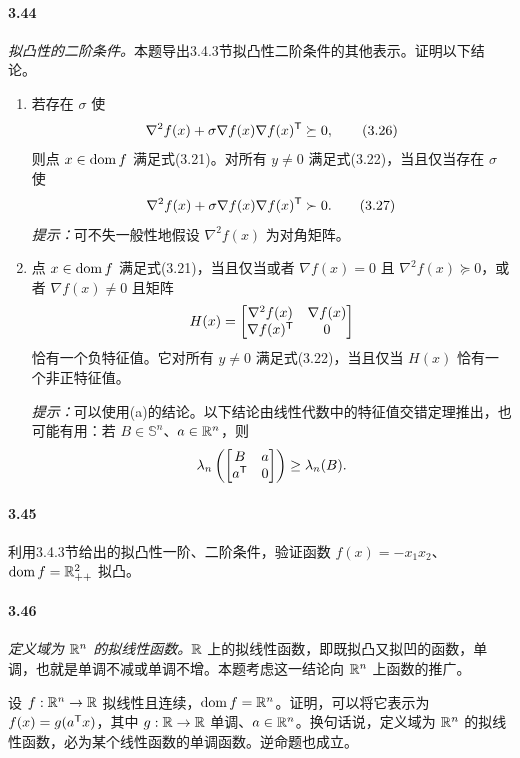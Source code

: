 \paragraph{3.44}\textit{拟凸性的二阶条件。}本题导出3.4.3节拟凸性二阶条件的其他表示。证明以下结论。
\begin{enumerate}[label=(\alph*)]
\item 若存在 $\sigma$ 使
\begin{equation}\nabla^2f(x)+\sigma\nabla f(x)\nabla f(x)^\mathsf T\succeq0,\tag{3.26}\end{equation}
则点 $x\in\operatorname{dom} f$ 满足式(3.21)。对所有 $y\ne0$ 满足式(3.22)，当且仅当存在 $\sigma$ 使
\begin{equation}\nabla^2f(x)+\sigma\nabla f(x)\nabla f(x)^\mathsf T\succ0.\tag{3.27}\end{equation}
\textit{提示：}可不失一般性地假设 $\nabla^2f(x)$ 为对角矩阵。
\item 点 $x\in\operatorname{dom} f$ 满足式(3.21)，当且仅当或者 $\nabla f(x)=0$ 且 $\nabla^2f(x)\succeq0$，或者 $\nabla f(x)\ne0$ 且矩阵
\[H(x)=\begin{bmatrix}\nabla^2f(x)&\nabla f(x)\\\nabla f(x)^\mathsf T&0\end{bmatrix}\]
恰有一个负特征值。它对所有 $y\ne0$ 满足式(3.22)，当且仅当 $H(x)$ 恰有一个非正特征值。

\textit{提示：}可以使用(a)的结论。以下结论由线性代数中的特征值交错定理推出，也可能有用：若 $B\in\mathbb S^n$、$a\in\mathbb R^n$，则
\[\lambda_n\left(\begin{bmatrix}B&a\\a^\mathsf T&0\end{bmatrix}\right)\geq\lambda_n(B).\]
\end{enumerate}
\paragraph{3.45}利用3.4.3节给出的拟凸性一阶、二阶条件，验证函数 $f(x)=-x_1x_2$、$\operatorname{dom} f=\mathbb R_{++}^2$ 拟凸。
\paragraph{3.46}\textit{定义域为 $\mathbb R^n$ 的拟线性函数。}$\mathbb R$ 上的拟线性函数，即既拟凸又拟凹的函数，单调，也就是单调不减或单调不增。本题考虑这一结论向 $\mathbb R^n$ 上函数的推广。

设 $f:\mathbb R^n\to\mathbb R$ 拟线性且连续，$\operatorname{dom} f=\mathbb R^n$。证明，可以将它表示为 $f(x)=g(a^\mathsf T x)$，其中 $g:\mathbb R\to\mathbb R$ 单调、$a\in\mathbb R^n$。换句话说，定义域为 $\mathbb R^n$ 的拟线性函数，必为某个线性函数的单调函数。逆命题也成立。
